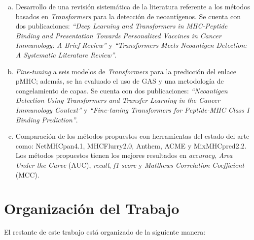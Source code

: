 \begin{enumerate}[(a)]
	\item Desarrollo de  una revisión sistemática de la literatura referente a los métodos basados en \textit{Transformers} para la detección de neoantígenos. Se cuenta con dos publicaciones: \textit{``Deep Learning and Transformers in MHC-Peptide Binding and Presentation Towards Personalized Vaccines in Cancer Immunology: A Brief Review''} \citep{machaca2023deep} y \textit{``Transformers Meets Neoantigen Detection: A Systematic Literature Review''}.
	\item \textit{Fine-tuning} a seis modelos de \textit{Transformers} para la predicción del enlace pMHC; además, se ha evaluado el uso de GAS y una metodología de congelamiento de capas. Se cuenta con dos publicaciones: \textit{``Neoantigen Detection Using Transformers and Transfer Learning in the Cancer Immunology Context''} \citep{arceda2023neoantigen} y \textit{``Fine-tuning Transformers for Peptide-MHC Class I Binding Prediction''}.
	\item Comparación de los métodos propuestos con herramientas del estado del arte como: NetMHCpan4.1, MHCFlurry2.0, Anthem, ACME y MixMHCpred2.2. Los métodos propuestos tienen los mejores resultados en \textit{accuracy}, \textit{Area Under the Curve} (AUC), \textit{recall}, \textit{f1-score} y \textit{Matthews Correlation Coefficient}  (MCC).
\end{enumerate}

\clearpage
\section{Organización del Trabajo}
\label{sec:organizaciondeltrabajo}

El restante de este trabajo está organizado de la siguiente manera:

